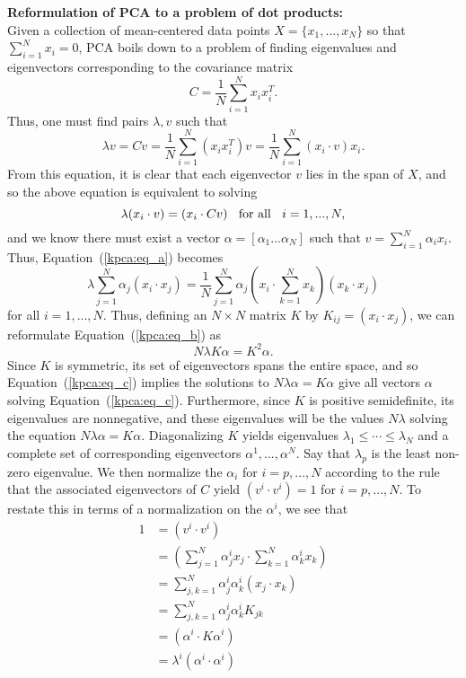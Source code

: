 \documentclass{gtpart}
\theoremstyle{definition}
\begin{document}
{\bf Reformulation of PCA to a problem of dot products:}\\
Given a collection of mean-centered data points $X = \{x_1, ..., x_N\}$ so that $\sum_{i=1}^N x_i = 0$, PCA boils down to a problem of finding eigenvalues and eigenvectors corresponding to the covariance matrix $$C = \frac{1}{N}\sum_{i=1}^N x_i x_i^T.$$ Thus, one must find pairs $\lambda, v$ such that $$\lambda v = Cv = \frac{1}{N}\sum_{i=1}^N (x_i x_i^T)v = \frac{1}{N}\sum_{i=1}^N (x_i \cdot v) x_i.$$ From this equation, it is clear that each eigenvector $v$ lies in the span of $X$, and so the above equation is equivalent to solving \begin{equation}\label{kpca:eq_a}\lambda(x_i \cdot v) = (x_i \cdot Cv) \text{\;\; for all \;\;} i = 1, ..., N,\end{equation} and we know there must exist a vector $\alpha = [\alpha_1 ... \alpha_N]$ such that $v = \sum_{i=1}^N \alpha_ix_i$. Thus, Equation~(\ref{kpca:eq_a}) becomes 
\begin{equation}\label{kpca:eq_b}
\lambda \sum_{j=1}^N \alpha_j(x_i \cdot x_j) =\frac{1}{N} \sum_{j=1}^N \alpha_j \left( x_i \cdot \sum_{k=1}^N x_k\right)(x_k \cdot x_j)
\end{equation} 
for all $i = 1, ..., N$. Thus, defining an $N \times N$ matrix $K$ by $K_{ij} = (x_i \cdot x_j)$, we can reformulate Equation~(\ref{kpca:eq_b}) as \begin{equation}\label{kpca:eq_c}N\lambda K \alpha = K^2 \alpha.\end{equation} Since $K$ is symmetric, its set of eigenvectors spans the entire space, and so Equation~(\ref{kpca:eq_c}) implies the solutions to $N\lambda \alpha = K \alpha$ give all vectors $\alpha$ solving Equation~(\ref{kpca:eq_c}). Furthermore, since $K$ is positive semidefinite, its eigenvalues are nonnegative, and these eigenvalues will be the values $N\lambda$ solving the equation $N\lambda \alpha = K \alpha$. Diagonalizing $K$ yields eigenvalues $\lambda_1 \leq \cdots \leq \lambda_N$ and a complete set of corresponding eigenvectors $\alpha^1, ..., \alpha^N$. Say that $\lambda_p$ is the least non-zero eigenvalue. We then normalize the $\alpha_i$ for $i = p, ..., N$ according to the rule that the associated eigenvectors of $C$ yield $(v^i \cdot v^i) = 1$ for $i = p, ..., N$. To restate this in terms of a normalization on the $\alpha^i$, we see that
\begin{align*}
1 &= (v^i \cdot v^i) \\
&= \left(\sum_{j=1}^N \alpha_j^i x_j \cdot \sum_{k=1}^N \alpha_k^i x_k \right) \\
&= \sum_{j, k = 1}^N \alpha_j^i\alpha_k^i (x_j \cdot x_k) \\
&=  \sum_{j, k = 1}^N \alpha_j^i\alpha_k^i K_{jk} \\
&= (\alpha^i \cdot K \alpha^i) \\
&= \lambda^i (\alpha^i \cdot \alpha^i)
\end{align*}
\end{document}
